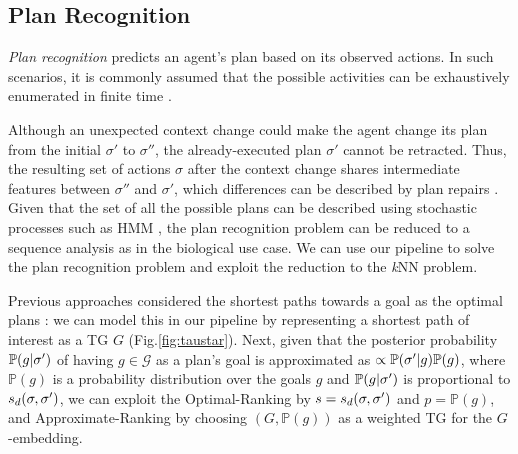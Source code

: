 
\subsection{Plan Recognition}
\textit{Plan recognition} predicts an agent's plan based on its observed actions. In such scenarios, it is commonly assumed that the possible activities can be exhaustively enumerated in finite time \cite{RamirezG09}. 

Although  an unexpected context change could make the agent change its plan from the initial $\sigma'$ to $\sigma''$, the already-executed plan $\sigma'$ cannot be retracted. Thus, the  resulting set of actions ${\sigma}$ after the context change  shares intermediate features between $\sigma''$ and $\sigma'$, which differences can be described by plan repairs \cite{FoxGLS06}. Given that the set of all the possible plans can be described using stochastic processes such as HMM \cite{LI2020101974}, the plan recognition problem can be reduced to a sequence analysis as in the biological use case. We can use our pipeline to solve the plan recognition problem and exploit the reduction to the \textit{k}NN problem. %


Previous approaches considered the shortest paths towards a goal as the optimal plans \cite{RamirezG10}: we can model this in our pipeline by %
representing a shortest path of interest as a TG $G$ (Fig.\ref{fig:taustar}). Next, given that the posterior probability $\mathbb{P}(g|{\sigma'})$ of having $g\in\mathcal{G}$ as a plan's goal is approximated  as $\propto \mathbb{P}({\sigma'}|g)\mathbb{P}(g)$, where $\mathbb{P}(g)$ is a probability distribution  over the goals $g$ and $\mathbb{P}(g|{\sigma'})$ is  proportional to $s_d(\sigma,{\sigma'})$, we can exploit the Optimal-Ranking by $s=s_d(\sigma,{\sigma'})$ and $p=\mathbb{P}(g)$, and Approximate-Ranking by choosing $(G,\mathbb{P}(g))$ as a weighted TG for the $G$-embedding.